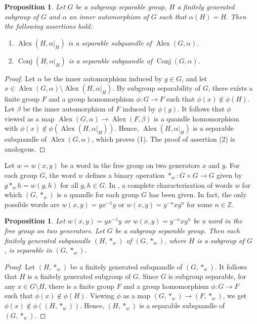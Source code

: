\documentclass[12pt]{amsart}
\newtheorem{prop}[theorem]{Proposition}
\theoremstyle{definition}
\numberwithin{equation}{subsection}
\newcommand{\Alex}{\operatorname{Alex}}
\newcommand{\Conj}{\operatorname{Conj}}
\begin{document}
\begin{prop}\label{alex-subseparable}
Let $G$ be a subgroup separable group, $H$ a finitely generated subgroup of $G$ and $\alpha$ an inner automorphism of $G$ such that $\alpha(H) =H.$ Then the following assertions hold:
\begin{enumerate}
\item $\Alex(H,\alpha|_H)$ is a  separable subquandle of $\Alex(G,\alpha)$.
\item $\Conj(H,\alpha|_H)$ is a  separable subquandle of $\Conj(G,\alpha)$.
\end{enumerate}
\end{prop}

\begin{proof}
Let $\alpha$ be the inner automorphism induced by $g \in G$, and let $x \in \Alex(G, \alpha) \setminus \Alex(H, \alpha|_H)$.  By subgroup separability of $G$, there exists a finite group $F$ and a group homomorphism $\phi:G \rightarrow F$ such that $\phi(x) \notin \phi(H)$. Let  $\beta$ be the inner automorphism of $F$ induced by $\phi(g)$. It follows that $\phi$ viewed as a map $\Alex(G, \alpha) \rightarrow \Alex(F, \beta)$  is a quandle homomorphism with $\phi(x) \notin \phi( \Alex(H,\alpha|_H))$. Hence, $\Alex(H, \alpha|_H)$ is a separable subquandle of $\Alex(G,\alpha)$, which proves (1). The proof of assertion (2) is analogous.
\end{proof}

Let $w = w(x, y)$ be a word in the free group on two generators $x$ and  $y$. For each group $G$, the word $w$ defines a binary operation $*_w : G \times G \to G$ given by $g *_w h = w(g, h)$ for all $g, h \in G$. In \cite[Proposition 3.1]{MR4406425}, a complete characterisation of words $w$ for which $(G, *_w)$ is a quandle for each group $G$ has been given. In fact, the only possible words are $w(x, y) = y x^{-1} y$ or $w(x, y) = y^{-n} x y^n$ for some $n \in \mathbb{Z}$.

\begin{prop}\label{conj-subseparable-quandle}
Let $w(x, y) = y x^{-1} y$ or $w(x, y) = y^{-n} x y^n$ be a word in the free group on two generators. Let $G$ be a subgroup separable group. Then each finitely generated subquandle $(H, *_w)$ of $(G, *_w)$, where $H$ is a subgroup of $G$, is separable in $(G, *_w)$.
\end{prop}

\begin{proof}
Let $(H, *_w)$ be a finitely generated subquandle of $(G, *_w)$. It follows that $H$ is a finitely generated subgroup of $G$. Since $G$ is subgroup separable, for any $x \in G \setminus H$, there is a finite group $F$ and a group homomorphism $\phi:G \to F$ such that $\phi(x) \not\in \phi(H)$. Viewing $\phi$ as a map $(G, *_w) \to (F, *_w)$, we get $\phi(x) \not\in \phi((H, *_w))$. Hence, $(H, *_w)$  is a separable subquandle of $(G, *_w)$.
\end{proof}
\end{document}
